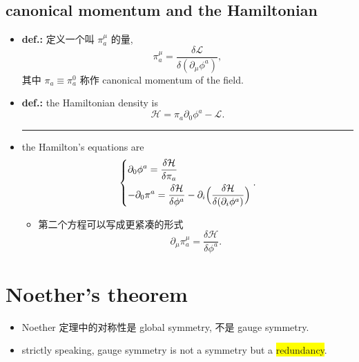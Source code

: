 \subsection{canonical momentum and the Hamiltonian}
\begin{itemize}
	\item \textbf{def.:} 定义一个叫 $\pi_a^\mu$ 的量,
	\begin{equation}
		\pi_a^\mu = \frac{\delta \mathcal{L}}{\delta (\partial_\mu \phi^a)},
	\end{equation}
	其中 $\pi_a \equiv \pi_a^0$ 称作 canonical momentum of the field.
	
	\item \textbf{def.:} the Hamiltonian density is
	\begin{equation}
		\mathcal{H} = \pi_a \partial_0 \phi^a - \mathcal{L}.
	\end{equation}
	
	\noindent\rule[0.5ex]{\linewidth}{0.5pt} %
	
	\item the Hamilton's equations are
	\begin{equation}
		\begin{dcases}
			\partial_0 \phi^a = \frac{\delta \mathcal{H}}{\delta \pi_a} \\
			- \partial_0 \pi^a = \frac{\delta \mathcal{H}}{\delta \phi^a} - \partial_i \Big( \frac{\delta \mathcal{H}}{\delta (\partial_i \phi^a)} \Big)
		\end{dcases}.
	\end{equation}
	\begin{itemize}
		\item 第二个方程可以写成更紧凑的形式
		\begin{equation}
			\partial_\mu \pi_a^\mu = \frac{\delta \mathcal{H}}{\delta \phi^a}.
		\end{equation}
	\end{itemize}
\end{itemize}

\section{Noether's theorem} \label{D.2}
\begin{itemize}
	\item Noether 定理中的对称性是 global symmetry, 不是 gauge symmetry.
	
	\item strictly speaking, gauge symmetry is not a symmetry but a \colorbox{yellow}{redundancy}.
\end{itemize}

